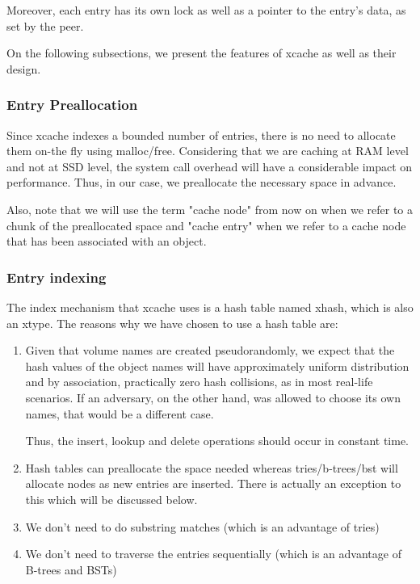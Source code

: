Moreover, each entry has its own lock as well as a pointer to the entry's data, 
as set by the peer.

On the following subsections, we present the features of xcache as well as 
their design.

\subsubsection{Entry Preallocation}\label{sec:xcache-entry-design}

Since xcache indexes a bounded number of entries, there is no need to allocate 
them on-the fly using malloc/free. Considering that we are caching at RAM level 
and not at SSD level, the system call overhead will have a considerable impact 
on performance. Thus, in our case, we preallocate the necessary space in 
advance.

Also, note that we will use the term "cache node" from now on when we refer to 
a chunk of the preallocated space and "cache entry" when we refer to a cache 
node that has been associated with an object.

\subsubsection{Entry indexing}\label{sec:xcache-index-design}

The index mechanism that xcache uses is a hash table named xhash, which is also 
an xtype. The reasons why we have chosen to use a hash table are:

\begin{enumerate}
	\item Given that volume names are created pseudorandomly, we expect 
		that the hash values of the object names will have 
		approximately uniform distribution and by association, 
		practically zero hash collisions, as in most real-life 
		scenarios. If an adversary, on the other hand, was allowed to 
		choose its own names, that would be a different case.

		Thus, the insert, lookup and delete operations should occur in 
		constant time.
	\item Hash tables can preallocate the space needed whereas 
		tries/b-trees/bst will allocate nodes as new entries are 
		inserted. There is actually an exception to this which will be 
		discussed below. \label{list:exception}
	\item We don't need to do substring matches (which is an advantage of 
		tries)
	\item We don't need to traverse the entries sequentially (which is an 
		advantage of B-trees and BSTs)
\end{enumerate}

